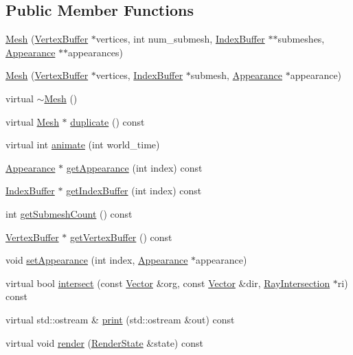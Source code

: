 \subsection*{Public Member Functions}
\begin{CompactItemize}
\item 
\hyperlink{classm3g_1_1Mesh_f2c80c243fdcd32b07c77d2ab3d565ab}{Mesh} (\hyperlink{classm3g_1_1VertexBuffer}{VertexBuffer} $\ast$vertices, int num\_\-submesh, \hyperlink{classm3g_1_1IndexBuffer}{IndexBuffer} $\ast$$\ast$submeshes, \hyperlink{classm3g_1_1Appearance}{Appearance} $\ast$$\ast$appearances)
\item 
\hyperlink{classm3g_1_1Mesh_2d7766ebbb63eccd77d0dd8b53b400a3}{Mesh} (\hyperlink{classm3g_1_1VertexBuffer}{VertexBuffer} $\ast$vertices, \hyperlink{classm3g_1_1IndexBuffer}{IndexBuffer} $\ast$submesh, \hyperlink{classm3g_1_1Appearance}{Appearance} $\ast$appearance)
\item 
virtual \hyperlink{classm3g_1_1Mesh_6e26384cfb03023e7dc2e5419baf813f}{$\sim$Mesh} ()
\item 
virtual \hyperlink{classm3g_1_1Mesh}{Mesh} $\ast$ \hyperlink{classm3g_1_1Mesh_52ce6d0b3eda2bd3a95bfb5b7dbb6f82}{duplicate} () const 
\item 
virtual int \hyperlink{classm3g_1_1Mesh_8aad1ceab4c2a03609c8a42324ce484d}{animate} (int world\_\-time)
\item 
\hyperlink{classm3g_1_1Appearance}{Appearance} $\ast$ \hyperlink{classm3g_1_1Mesh_4950a19e02c022dcf41a086117eb8219}{getAppearance} (int index) const 
\item 
\hyperlink{classm3g_1_1IndexBuffer}{IndexBuffer} $\ast$ \hyperlink{classm3g_1_1Mesh_ca34a663f46ce20e2b894c046714ea1d}{getIndexBuffer} (int index) const 
\item 
int \hyperlink{classm3g_1_1Mesh_5dc5a57ad549eb97504c2a1280a882dd}{getSubmeshCount} () const 
\item 
\hyperlink{classm3g_1_1VertexBuffer}{VertexBuffer} $\ast$ \hyperlink{classm3g_1_1Mesh_7602e9bf450fa8b3ec3c60e2e88cba25}{getVertexBuffer} () const 
\item 
void \hyperlink{classm3g_1_1Mesh_bb03b872c453c4f8f3fe31e8b54d1b52}{setAppearance} (int index, \hyperlink{classm3g_1_1Appearance}{Appearance} $\ast$appearance)
\item 
virtual bool \hyperlink{classm3g_1_1Mesh_dc812d8230f94f0b6b8e4fecdb802a16}{intersect} (const \hyperlink{classm3g_1_1Vector}{Vector} \&org, const \hyperlink{classm3g_1_1Vector}{Vector} \&dir, \hyperlink{classm3g_1_1RayIntersection}{RayIntersection} $\ast$ri) const 
\item 
virtual std::ostream \& \hyperlink{classm3g_1_1Mesh_6fea17fa1532df3794f8cb39cb4f911f}{print} (std::ostream \&out) const 
\item 
virtual void \hyperlink{classm3g_1_1Mesh_8babc8a79b78615da51161e94029eea9}{render} (\hyperlink{structm3g_1_1RenderState}{RenderState} \&state) const 
\end{CompactItemize}
